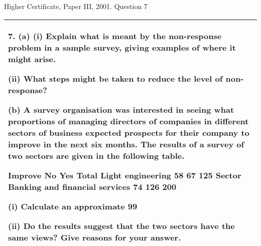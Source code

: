 \documentclass[a4paper,12pt]{article}
\begin{document}


Higher Certificate, Paper III, 2001. Question 7


\begin{table}[ht!]
     


\centering
     


\begin{tabular}{|p{15cm}|}
     


\hline 

7. (a) (i) Explain what is meant by the non-response problem in a sample survey, giving examples of where it might arise.  
 
  (ii) What steps might be taken to reduce the level of non-response?  
 
 
(b) A survey organisation was interested in seeing what proportions of managing directors of companies in different sectors
 of business expected prospects for their company to improve in the next six months.  
The results of a survey of two sectors are given in the following table. 
 
  Improve    No Yes Total Light engineering 58 67 125 Sector Banking and financial services 74 126 200 
 
(i) Calculate an approximate 99%
 
(ii) Do the results suggest that the two sectors have the same views?  Give reasons for your answer.  
 
 
 
\\ \hline



\end{tabular}
    


\end{table}


\end{document}
